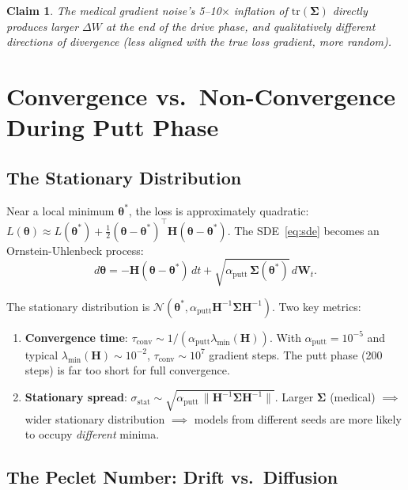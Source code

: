 \documentclass{article}
\newtheorem{claim}{Claim}
\newcommand{\btheta}{\boldsymbol{\theta}}
\newcommand{\bSigma}{\boldsymbol{\Sigma}}
\newcommand{\bH}{\mathbf{H}}
\begin{document}
\begin{claim}
The medical gradient noise's 5--10$\times$ inflation of $\mathrm{tr}(\bSigma)$
directly produces larger $\Delta W$ at the end of the drive phase, and
\emph{qualitatively different} directions of divergence (less aligned with
the true loss gradient, more random).
\end{claim}

\section{Convergence vs.\ Non-Convergence During Putt Phase}

\subsection{The Stationary Distribution}

Near a local minimum $\btheta^*$, the loss is approximately quadratic:
$L(\btheta) \approx L(\btheta^*) + \frac{1}{2}(\btheta - \btheta^*)^\top \bH (\btheta - \btheta^*)$.
The SDE~\eqref{eq:sde} becomes an Ornstein-Uhlenbeck process:
\begin{equation}
d\btheta = -\bH(\btheta - \btheta^*)\,dt + \sqrt{\alpha_{\text{putt}}\,\bSigma(\btheta^*)}\,d\mathbf{W}_t.
\end{equation}

The stationary distribution is $\mathcal{N}(\btheta^*, \alpha_{\text{putt}} \bH^{-1} \bSigma \bH^{-1})$.
Two key metrics:

\begin{enumerate}
\item \textbf{Convergence time}: $\tau_{\text{conv}} \sim 1/(\alpha_{\text{putt}} \lambda_{\min}(\bH))$.
      With $\alpha_{\text{putt}} = 10^{-5}$ and typical $\lambda_{\min}(\bH) \sim 10^{-2}$,
      $\tau_{\text{conv}} \sim 10^7$ gradient steps.  The putt phase (200 steps)
      is far too short for full convergence.

\item \textbf{Stationary spread}: $\sigma_{\text{stat}} \sim
      \sqrt{\alpha_{\text{putt}} \, \|\bH^{-1} \bSigma \bH^{-1}\|}$.
      Larger $\bSigma$ (medical) $\implies$ wider stationary distribution
      $\implies$ models from different seeds are more likely to occupy
      \emph{different} minima.
\end{enumerate}

\subsection{The Peclet Number: Drift vs.\ Diffusion}
\end{document}
